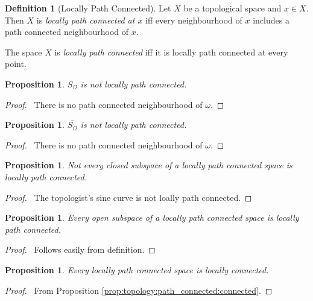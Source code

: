 \documentclass{report}
\let\qed\relax
\newtheorem{prop}[lm]{Proposition}
\theoremstyle{definition}
\newtheorem{df}[lm]{Definition}
\begin{document}
  \begin{df}[Locally Path Connected]
    Let $X$ be a topological space and $x \in X$. Then $X$ is \emph{locally
      path connected at $x$} iff every neighbourhood of $x$ includes a path
    connected neighbourhood of $x$.

    The space $X$ is \emph{locally path connected} iff it is locally path
    connected
    at every point.
  \end{df}

   \begin{prop}
  $S_\Omega$ is not locally path connected.
 \end{prop}

 \begin{proof}
  \pf\ There is no path connected neighbourhood of $\omega$. \qed
 \end{proof}

  \begin{prop}
   $\overline{S_\Omega}$ is not locally path connected.
 \end{prop}

 \begin{proof}
  \pf\ There is no path connected neighbourhood of $\omega$. \qed
 \end{proof}

 \begin{prop}
   Not every closed subspace of a locally path connected space is locally path connected.
 \end{prop}

 \begin{proof}
   \pf\ The topologist's sine curve is not loally path connected. \qed
 \end{proof}

 \begin{prop}
   Every open subspace of a locally path connected space is locally path connected.
 \end{prop}

 \begin{proof}
   \pf\ Follows easily from definition. \qed
 \end{proof}

 \begin{prop}
  Every locally path connected space is locally connected.
 \end{prop}

 \begin{proof}
  \pf\ From Proposition \ref{prop:topology:path_connected:connected}. \qed
 \end{proof}
\end{document}
